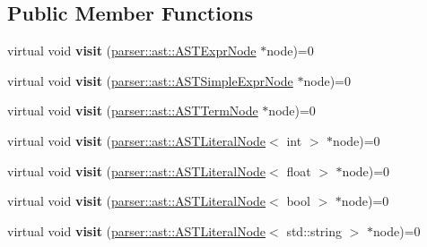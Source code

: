 \subsection*{Public Member Functions}
\begin{DoxyCompactItemize}
\item 
\mbox{\label{classvisitor_1_1Visitor_a4bcdea24daca965b9b6b286ee92950e6}} 
virtual void {\bfseries visit} (\hyperlink{classparser_1_1ast_1_1ASTExprNode}{parser\+::ast\+::\+A\+S\+T\+Expr\+Node} $\ast$node)=0
\item 
\mbox{\label{classvisitor_1_1Visitor_a46ef198e210079ede5d18a38f41c2470}} 
virtual void {\bfseries visit} (\hyperlink{classparser_1_1ast_1_1ASTSimpleExprNode}{parser\+::ast\+::\+A\+S\+T\+Simple\+Expr\+Node} $\ast$node)=0
\item 
\mbox{\label{classvisitor_1_1Visitor_a59a4b68c20ef86cdab7bef5a43f4cd93}} 
virtual void {\bfseries visit} (\hyperlink{classparser_1_1ast_1_1ASTTermNode}{parser\+::ast\+::\+A\+S\+T\+Term\+Node} $\ast$node)=0
\item 
\mbox{\label{classvisitor_1_1Visitor_a4f25bb484a62d700a50b8bdbd9be8de1}} 
virtual void {\bfseries visit} (\hyperlink{classparser_1_1ast_1_1ASTLiteralNode}{parser\+::ast\+::\+A\+S\+T\+Literal\+Node}$<$ int $>$ $\ast$node)=0
\item 
\mbox{\label{classvisitor_1_1Visitor_a5339173a4229acf5995f0d9291bd318a}} 
virtual void {\bfseries visit} (\hyperlink{classparser_1_1ast_1_1ASTLiteralNode}{parser\+::ast\+::\+A\+S\+T\+Literal\+Node}$<$ float $>$ $\ast$node)=0
\item 
\mbox{\label{classvisitor_1_1Visitor_a9e0343d14cd0b5e86171270654507df0}} 
virtual void {\bfseries visit} (\hyperlink{classparser_1_1ast_1_1ASTLiteralNode}{parser\+::ast\+::\+A\+S\+T\+Literal\+Node}$<$ bool $>$ $\ast$node)=0
\item 
\mbox{\label{classvisitor_1_1Visitor_ab94902694cd7e8ac8ff4dfeb462b13be}} 
virtual void {\bfseries visit} (\hyperlink{classparser_1_1ast_1_1ASTLiteralNode}{parser\+::ast\+::\+A\+S\+T\+Literal\+Node}$<$ std\+::string $>$ $\ast$node)=0

\end{DoxyCompactItemize}
